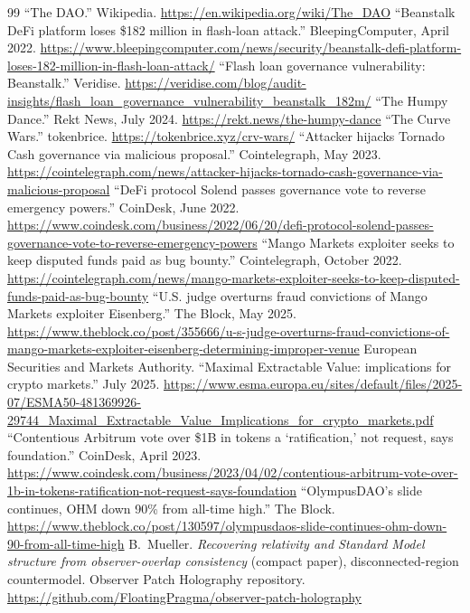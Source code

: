 \documentclass[11pt]{article}
\begin{document}
\begin{thebibliography}{99}
\small
{} ``The DAO.'' Wikipedia. \url{https://en.wikipedia.org/wiki/The_DAO}
 ``Beanstalk DeFi platform loses \$182 million in flash-loan attack.'' BleepingComputer, April 2022. \url{https://www.bleepingcomputer.com/news/security/beanstalk-defi-platform-loses-182-million-in-flash-loan-attack/}
 ``Flash loan governance vulnerability: Beanstalk.'' Veridise. \url{https://veridise.com/blog/audit-insights/flash_loan_governance_vulnerability_beanstalk_182m/}
 ``The Humpy Dance.'' Rekt News, July 2024. \url{https://rekt.news/the-humpy-dance}
 ``The Curve Wars.'' tokenbrice. \url{https://tokenbrice.xyz/crv-wars/}
 ``Attacker hijacks Tornado Cash governance via malicious proposal.'' Cointelegraph, May 2023. \url{https://cointelegraph.com/news/attacker-hijacks-tornado-cash-governance-via-malicious-proposal}
 ``DeFi protocol Solend passes governance vote to reverse emergency powers.'' CoinDesk, June 2022. \url{https://www.coindesk.com/business/2022/06/20/defi-protocol-solend-passes-governance-vote-to-reverse-emergency-powers}
 ``Mango Markets exploiter seeks to keep disputed funds paid as bug bounty.'' Cointelegraph, October 2022. \url{https://cointelegraph.com/news/mango-markets-exploiter-seeks-to-keep-disputed-funds-paid-as-bug-bounty}
 ``U.S. judge overturns fraud convictions of Mango Markets exploiter Eisenberg.'' The Block, May 2025. \url{https://www.theblock.co/post/355666/u-s-judge-overturns-fraud-convictions-of-mango-markets-exploiter-eisenberg-determining-improper-venue}
 European Securities and Markets Authority. ``Maximal Extractable Value: implications for crypto markets.'' July 2025. \url{https://www.esma.europa.eu/sites/default/files/2025-07/ESMA50-481369926-29744_Maximal_Extractable_Value_Implications_for_crypto_markets.pdf}
 ``Contentious Arbitrum vote over \$1B in tokens a `ratification,' not request, says foundation.'' CoinDesk, April 2023. \url{https://www.coindesk.com/business/2023/04/02/contentious-arbitrum-vote-over-1b-in-tokens-ratification-not-request-says-foundation}
 ``OlympusDAO's slide continues, OHM down 90\% from all-time high.'' The Block. \url{https://www.theblock.co/post/130597/olympusdaos-slide-continues-ohm-down-90-from-all-time-high}
 B.~Mueller. \emph{Recovering relativity and Standard Model structure from observer-overlap consistency} (compact paper), disconnected-region countermodel. Observer Patch Holography repository. \url{https://github.com/FloatingPragma/observer-patch-holography}
\end{thebibliography}
\end{document}
